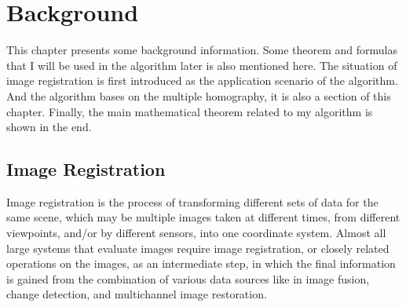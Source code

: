 \chapter{Background}\label{ch:Background}
This chapter presents some background information. Some theorem and formulas that I will be used in the algorithm later is also mentioned here. The situation of image registration is first introduced as the application scenario of the algorithm. And the algorithm bases on the multiple homography, it is also a section of this chapter. Finally, the main mathematical theorem related to my algorithm is shown in the end.

\section{Image Registration}
Image registration is the process of transforming different sets of data for the same scene, which may be multiple images taken at different times, from different viewpoints, and/or by different sensors,  into one coordinate system. Almost all large systems that evaluate images require image registration, or closely related operations on the images, as an intermediate step, in which the final information is gained from the combination of various data sources like in image fusion, change detection, and multichannel image restoration.

